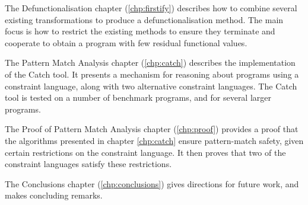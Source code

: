 The Defunctionalisation chapter (\ref{chp:firstify}) describes how to combine several existing transformations to produce a defunctionalisation method. The main focus is how to restrict the existing methods to ensure they terminate and cooperate to obtain a program with few residual functional values.

The Pattern Match Analysis chapter (\ref{chp:catch}) describes the implementation of the Catch tool. It presents a mechanism for reasoning about programs using a constraint language, along with two alternative constraint languages. The Catch tool is tested on a number of benchmark programs, and for several larger programs.

The Proof of Pattern Match Analysis chapter (\ref{chp:proof}) provides a proof that the algorithms presented in chapter \ref{chp:catch} ensure pattern-match safety, given certain restrictions on the constraint language. It then proves that two of the constraint languages satisfy these restrictions.

The Conclusions chapter (\ref{chp:conclusions}) gives directions for future work, and makes concluding remarks.

